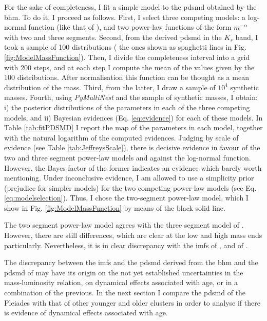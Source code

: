 For the sake of completeness, I fit a simple model to the \gls{pdsmd} obtained by the \gls{bhm}. To do it, I proceed as follows. First, I select three competing models: a log-normal function (like that of \citet{Chabrier2003b,Chabrier2005}), and two power-law functions of the form $m^{-\alpha}$ with two and three segments. Second, from the derived \gls{pdsmd} in the $K_s$ band, I took a sample of 100 distributions ( the ones shown as spaghetti lines in Fig. \ref{fig:ModelMassFunction}). Then, I divide  the completeness interval into a grid with 200 steps, and at each step I compute the mean of the values given by the 100 distributions. After normalisation this function can be thought as a mean distribution of the mass. Third, from the latter, I draw a sample of $10^4$ synthetic masses. Fourth, using \emph{PyMultiNest} \citep{Buchner2014} and the sample of synthetic masses, I obtain: i) the posterior distributions of the parameters in each of the three competing models, and ii) Bayesian evidences (Eq. \ref{eq:evidence}) for each of these models. In Table \ref{tab:fitPDSMD} I report the \gls{map} of the parameters in each model, together with the natural logarithm of the computed evidences. Judging by \citet{Jeffreys61} scale of evidence (see Table \ref{tab:JeffreysScale}), there is decisive evidence in favour of the two and three segment power-law models and against the log-normal function. However, the Bayes factor of the former indicates an evidence which barely worth mentioning. Under inconclusive evidence, I am allowed to use a simplicity prior (prejudice for simpler models) for the two competing power-law models (see Eq. \ref{eq:modelselection}). Thus, I chose the two-segment power-law model, which I show in Fig. \ref{fig:ModelMassFunction} by means of the black solid line.

The two segment power-law model agrees with the three segment model of \citet{Bouy2015}. However, there are still differences, which are clear at the low and high mass ends particularly. Nevertheless, it is in clear discrepancy with the \glspl{imf} of \citet{Chabrier2005},  \cite[$m_c=0.25_{-0.016}^{+0.021}$ and $\sigma=0.55_{-0.01}^{+0.05}$, the uncertainties are those reported by][for single objects]{Chabrier2003b} and of \citet{Thies2007}. 

The discrepancy between the \glspl{imf} and the \gls{pdsmd} derived from the \gls{bhm} and the \gls{pdsmd} of \citet{Bouy2015} may have its origin on the not yet established uncertainties in the mass-luminosity relation, on dynamical effects associated with age, or in a combination of the previous. In the next section I compare the \gls{pdsmd} of the Pleiades with that of other younger and older clusters in order to analyse if there is evidence of dynamical effects associated with age.


